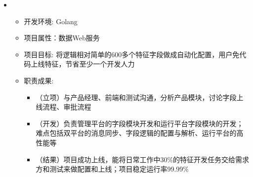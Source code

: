   \begin{itemize}[leftmargin=*]
    \item
      {\small
      \begin{itemize}
        \item 开发环境: Golang
        \item 项目属性：数据Web服务
        \item 项目目标: 将逻辑相对简单的600多个特征字段做成自动化配置，用户免代码上线特征，节省至少一个开发人力
        \item 职责成果: 
        \begin{itemize}
          \item （立项）与产品经理、前端和测试沟通，分析产品模块，讨论字段上线流程、审批流程
          \item （开发）负责管理平台的字段模块开发和运行平台字段模块的开发；难点包括双平台的消息同步、字段逻辑的配置与解析、运行平台的高性能等
          \item （结果）项目成功上线，能将日常工作中30\%的特征开发任务交给需求方和测试来做配置和上线；项目稳定运行率99.99\%
        \end{itemize}
      \end{itemize}
      }
  \end{itemize}

